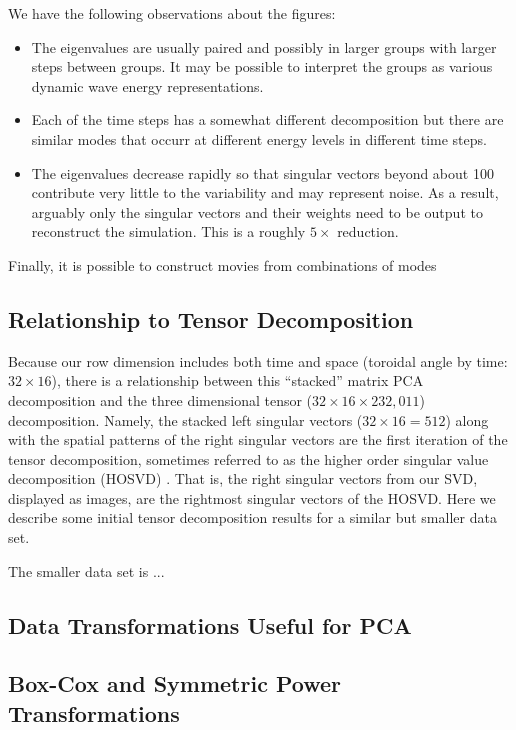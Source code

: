 We have the following observations about the figures:
\begin{itemize}
\item The eigenvalues are usually paired and possibly in larger groups
  with larger steps between groups. It may be possible to interpret
  the groups as various dynamic wave energy representations.
\item Each of the time steps has a somewhat different decomposition
  but there are similar modes that occurr at different energy levels in
  different time steps.
\item The eigenvalues decrease rapidly so that singular vectors beyond
  about 100 contribute very little to the variability and may
  represent noise. As a result, arguably only the singular vectors and
  their weights need to be output to reconstruct the simulation. This
  is a roughly $5\times$ reduction.
\end{itemize}
Finally, it is possible to construct movies from combinations of modes 

\subsection{Relationship to Tensor Decomposition}
Because our row dimension includes both time and space (toroidal angle
by time: $32\times 16$), there is a relationship between this
``stacked'' matrix PCA decomposition and the three dimensional tensor
($32\times 16\times 232,011$) decomposition. Namely, the stacked left
singular vectors ($32\times 16 = 512$) along with the spatial patterns
of the right singular vectors are the first iteration of the tensor
decomposition, sometimes referred to as the higher order singular
value decomposition (HOSVD) \cite[p.1264]{DeLathauwer2000}. That is,
the right singular vectors from our SVD, displayed as images, are the
rightmost singular 
vectors of the HOSVD. Here we describe some initial tensor
decomposition results for a similar but smaller data set.

The smaller data set is ...


\newpage
\subsection{Data Transformations Useful for PCA}
\subsection{Box-Cox and Symmetric Power Transformations}


